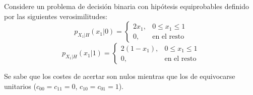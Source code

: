 \ifspanish

\question Considere un problema de decisión binaria con hipótesis equiprobables definido por las siguientes verosimilitudes:
\[
p_{X_1|H}(x_1|0) = \left \{
  \begin{array}{cc}
    2x_1, & 0 \le x_1 \le 1\\
    0,    & \mbox{en el resto}
  \end{array}
\right.
\]
\[
p_{X_1|H}(x_1|1) = \left \{
  \begin{array}{cc}
    2(1-x_1), & 0 \le x_1 \le 1\\
    0, & \mbox{en el resto}
  \end{array}
\right.
\]

Se sabe que  los costes de acertar son nulos mientras que los de equivocarse unitarios ($c_{00} = c_{11} =0$, $c_{10} = c_{01}=1$).

